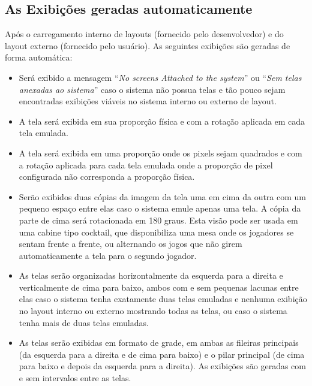 \documentclass[letterpaper,10pt,brazil]{sphinxmanual}
\begin{document}
\subsection{As Exibições geradas automaticamente}
\label{techspecs/layout_files:as-exibicoes-geradas-automaticamente}\label{techspecs/layout_files:layout-autogen}
Após o carregamento interno de layouts (fornecido pelo desenvolvedor) e
do layout externo (fornecido pelo usuário). As seguintes exibições são
geradas de forma automática:
\begin{itemize}
\item {} 
Será exibido a mensagem ``\emph{No screens Attached to the system}'' ou
``\emph{Sem telas anexadas ao sistema}'' caso o sistema não possua telas e
tão pouco sejam encontradas exibições viáveis no sistema interno ou
externo de layout.

\item {} 
A tela será exibida em sua proporção física e com a rotação aplicada
em cada tela emulada.

\item {} 
A tela será exibida em uma proporção onde os pixels sejam quadrados e
com a rotação aplicada para cada tela emulada onde a proporção de
pixel configurada não corresponda a proporção física.

\item {} 
Serão exibidos duas cópias da imagem da tela uma em cima da outra com
um pequeno espaço entre elas caso o sistema emule apenas uma tela.
A cópia da parte de cima será rotacionada em 180 graus. Esta visão
pode ser usada em uma cabine tipo cocktail, que disponibiliza uma mesa
onde os jogadores se sentam frente a frente, ou alternando os jogos
que não girem automaticamente a tela para o segundo jogador.

\item {} 
As telas serão organizadas horizontalmente da esquerda para a direita
e verticalmente de cima para baixo, ambos com e sem pequenas lacunas
entre elas caso o sistema tenha exatamente duas telas emuladas e
nenhuma exibição no layout interno ou externo mostrando todas as
telas, ou caso o sistema tenha mais de duas telas emuladas.

\item {} 
As telas serão exibidas em formato de grade, em ambas as fileiras
principais (da esquerda para a direita e de cima para baixo) e o pilar
principal (de cima para baixo e depois da esquerda para a direita).
As exibições são geradas com e sem intervalos entre as telas.

\end{itemize}
\clearpage
\end{document}
